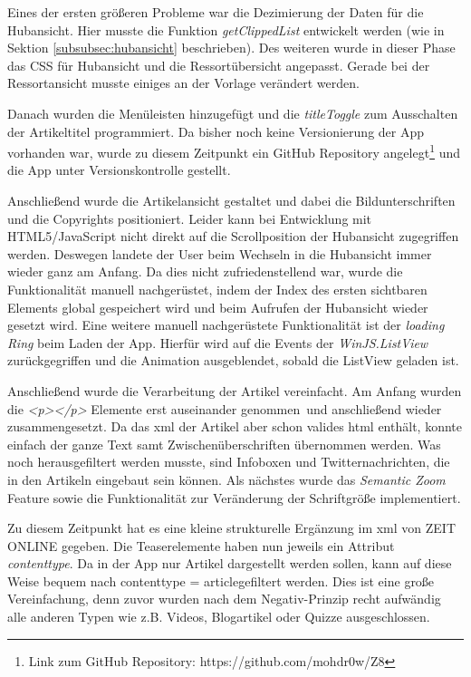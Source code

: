 \documentclass[12pt,a4paper,bibtotoc,abstracton]{scrartcl}
\begin{document}
Eines der ersten größeren Probleme war die Dezimierung der Daten für die Hubansicht. Hier musste die Funktion \textit{getClippedList} entwickelt werden (wie in Sektion \ref{subsubsec:hubansicht} beschrieben). Des weiteren wurde in dieser Phase das CSS für Hubansicht und die Ressortübersicht angepasst. Gerade bei der Ressortansicht musste einiges an der Vorlage verändert werden.

Danach wurden die Menüleisten hinzugefügt  und die \textit{titleToggle} zum Ausschalten der Artikeltitel programmiert. Da bisher noch keine Versionierung der App vorhanden war, wurde zu diesem Zeitpunkt ein GitHub Repository angelegt\footnote{Link zum GitHub Repository: https://github.com/mohdr0w/Z8} und die App unter Versionskontrolle gestellt. 

Anschließend wurde die Artikelansicht gestaltet und dabei die Bildunterschriften und die Copyrights positioniert. Leider kann bei Entwicklung mit HTML5/JavaScript nicht direkt auf die Scrollposition der Hubansicht zugegriffen werden. Deswegen landete der User beim Wechseln in die Hubansicht immer wieder ganz am Anfang. Da dies nicht zufriedenstellend war, wurde die Funktionalität manuell nachgerüstet, indem der Index des ersten sichtbaren Elements global gespeichert wird und beim Aufrufen der Hubansicht wieder gesetzt wird. Eine weitere manuell nachgerüstete Funktionalität ist der \textit{loading Ring} beim Laden der App. Hierfür wird auf die Events der \textit{WinJS.ListView} zurückgegriffen und die Animation ausgeblendet, sobald die ListView geladen ist.

Anschließend wurde die Verarbeitung der Artikel vereinfacht. Am Anfang wurden die \textit{<p></p>} Elemente erst \glqq auseinander genommen\grqq\ und anschließend wieder zusammengesetzt. Da das \ac{xml} der Artikel aber schon valides \ac{html} enthält, konnte einfach der ganze Text samt Zwischenüberschriften übernommen werden. Was noch herausgefiltert werden musste, sind Infoboxen und Twitternachrichten, die in den Artikeln eingebaut sein können. Als nächstes wurde das \textit{Semantic Zoom} Feature sowie die Funktionalität zur Veränderung der Schriftgröße implementiert.   

Zu diesem Zeitpunkt hat es eine kleine strukturelle Ergänzung im \ac{xml} von ZEIT ONLINE gegeben. Die Teaserelemente haben nun jeweils ein Attribut \textit{contenttype}. Da in der App nur Artikel dargestellt werden sollen, kann auf diese Weise bequem nach \glqq contenttype = article\grqq gefiltert werden. Dies ist eine große Vereinfachung, denn zuvor wurden nach dem Negativ-Prinzip recht aufwändig alle anderen Typen wie z.B. Videos, Blogartikel oder Quizze ausgeschlossen.  
\end{document}
